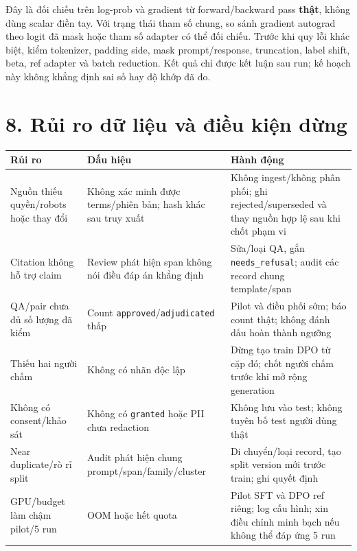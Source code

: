 \documentclass[11pt,a4paper]{article}
\begin{document}
Đây là đối chiếu trên log-prob và gradient từ forward/backward pass
\textbf{thật}, không dùng scalar điền tay. Với trạng thái tham số chung,
so sánh gradient autograd theo logit đã mask hoặc tham số adapter có thể
đối chiếu. Trước khi quy lỗi khác biệt, kiểm tokenizer, padding side,
mask prompt/response, truncation, label shift, beta, ref adapter và
batch reduction. Kết quả chỉ được kết luận sau run; kế hoạch này không
khẳng định sai số hay độ khớp đã đo.

\section{8. Rủi ro dữ liệu và điều kiện
dừng}\label{rux1ee7i-ro-dux1eef-liux1ec7u-vuxe0-ux111iux1ec1u-kiux1ec7n-dux1eebng}

{\def\LTcaptype{none} %
\begin{longtable}[]{@{}
  >{\raggedright\arraybackslash}p{}
  >{\raggedright\arraybackslash}p{}
  >{\raggedright\arraybackslash}p{}@{}}
\toprule\noalign{}
\begin{minipage}[b]{\linewidth}\raggedright
Rủi ro
\end{minipage} & \begin{minipage}[b]{\linewidth}\raggedright
Dấu hiệu
\end{minipage} & \begin{minipage}[b]{\linewidth}\raggedright
Hành động
\end{minipage} \\
\midrule\noalign{}
\endhead
\bottomrule\noalign{}
\endlastfoot
Nguồn thiếu quyền/robots hoặc thay đổi & Không xác minh được terms/phiên
bản; hash khác sau truy xuất & Không ingest/không phân phối; ghi
rejected/superseded và thay nguồn hợp lệ sau khi chốt phạm vi \\
Citation không hỗ trợ claim & Review phát hiện span không nói điều đáp
án khẳng định & Sửa/loại QA, gắn \nolinkurl{needs_refusal}; audit các
record chung template/span \\
QA/pair chưa đủ số lượng đã kiểm & Count
\nolinkurl{approved}/\nolinkurl{adjudicated} thấp & Pilot và điều phối
sớm; báo count thật; không đánh dấu hoàn thành ngưỡng \\
Thiếu hai người chấm & Không có nhãn độc lập & Dừng tạo train DPO từ cặp
đó; chốt người chấm trước khi mở rộng generation \\
Không có consent/khảo sát & Không có \nolinkurl{granted} hoặc PII chưa
redaction & Không lưu vào test; không tuyên bố test người dùng thật \\
Near duplicate/rò rỉ split & Audit phát hiện chung
prompt/span/family/cluster & Di chuyển/loại record, tạo split version
mới trước train; ghi quyết định \\
GPU/budget làm chậm pilot/5 run & OOM hoặc hết quota & Pilot SFT và DPO
ref riêng; log cấu hình; xin điều chỉnh minh bạch nếu không thể đáp ứng
5 run \\
\end{longtable}
}
\end{document}

